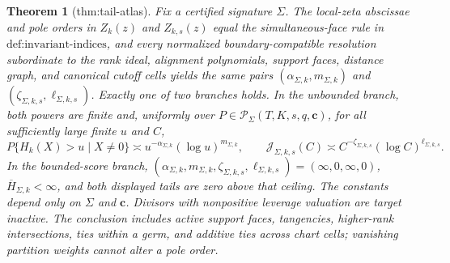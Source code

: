 \documentclass{article}
\newtheorem{theorem}{Theorem}
\begin{document}
\begin{theorem}[thm:tail-atlas]\label{thm:tail-atlas}
Fix a certified signature \(\Sigma\). The local-zeta abscissae and pole orders in \(Z_k(z)\) and \(Z_{k,s}(z)\) equal the simultaneous-face rule in \(\text{def:invariant-indices}\), and every normalized boundary-compatible resolution subordinate to the rank ideal, alignment polynomials, support faces, distance graph, and canonical cutoff cells yields the same pairs \((\alpha_{\Sigma,k},m_{\Sigma,k})\) and \((\zeta_{\Sigma,k,s},\ell_{\Sigma,k,s})\). Exactly one of two branches holds. In the unbounded branch, both powers are finite and, uniformly over \(P\in\mathcal P_\Sigma(T,K,s,q,\mathbf c)\), for all sufficiently large finite \(u\) and \(C\), \[P\{H_k(X)>u\mid X\ne0\}\asymp u^{-\alpha_{\Sigma,k}}(\log u)^{m_{\Sigma,k}},\qquad\mathcal J_{\Sigma,k,s}(C)\asymp C^{-\zeta_{\Sigma,k,s}}(\log C)^{\ell_{\Sigma,k,s}}.\] In the bounded-score branch, \((\alpha_{\Sigma,k},m_{\Sigma,k},\zeta_{\Sigma,k,s},\ell_{\Sigma,k,s})=(\infty,0,\infty,0)\), \(\overline H_{\Sigma,k}<\infty\), and both displayed tails are zero above that ceiling. The constants depend only on \(\Sigma\) and \(\mathbf c\). Divisors with nonpositive leverage valuation are target inactive. The conclusion includes active support faces, tangencies, higher-rank intersections, ties within a germ, and additive ties across chart cells; vanishing partition weights cannot alter a pole order.
\end{theorem}
\end{document}
